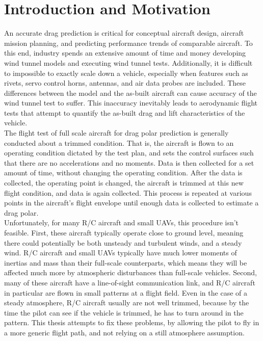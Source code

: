 \chapter{Introduction and Motivation}
\label{intro}
An accurate drag prediction is critical for conceptual aircraft design, aircraft mission planning, and predicting performance trends of comparable aircraft. To this end, industry spends an extensive amount of time and money developing wind tunnel models and executing wind tunnel tests. 
Additionally, it is difficult to impossible to exactly scale down a vehicle, especially when features such as rivets, servo control horns, antennas, and air data probes are included. These differences between the model and the as-built aircraft can cause accuracy of the wind tunnel test to suffer. This inaccuracy 
inevitably leads to aerodynamic flight tests that attempt to quantify the as-built drag and lift characteristics of the vehicle.
\\
The flight test of full scale aircraft for drag polar prediction is generally conducted about a trimmed condition. That is, the aircraft is flown to an operating condition dictated by the test plan, and sets the control surfaces such that there are no accelerations and no moments. Data is then collected for a set amount of time, without changing the operating condition. After the data is collected, the operating point is changed, the aircraft is trimmed at this new flight condition, and data is again collected. This process is repeated at various points in the aircraft's flight envelope until enough data is collected to estimate a drag polar.\\
Unfortunately, for many R/C aircraft and small UAVs, this procedure isn't feasible. First, these aircraft typically operate close to ground level, meaning there could potentially be both unsteady and turbulent winds, and a steady wind. R/C aircraft and small UAVs typically have much lower moments of inertias and mass than their full-scale counterparts, which means they will be affected much more by atmospheric disturbances than full-scale vehicles. Second, many of these aircraft have a line-of-sight communication link, and R/C aircraft in particular are flown in small patterns at a flight field. Even in the case of a steady atmosphere, R/C aircraft usually are not well trimmed, because by the time the pilot can see if the vehicle is trimmed, he has to turn around in the pattern. This thesis attempts to fix these problems, by allowing the pilot to fly in a more generic flight path, and not relying on a still atmosphere assumption.